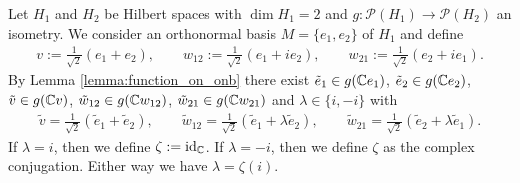 \begin{example} \label{example:twodim}
	Let $H_1$ and $H_2$ be Hilbert spaces with $\dim H_1 = 2$ and $g: \mathcal{P}(H_1) \to \mathcal{P}(H_2)$ an isometry. We consider an orthonormal basis $M = \{e_1, e_2\}$ of $H_1$ and define
	\begin{align*}
		v := \frac{1}{\sqrt{2}}(e_1 + e_2), \qquad w_{12} := \frac{1}{\sqrt{2}}(e_1 + i e_2), \qquad  w_{21} := \frac{1}{\sqrt{2}}(e_2 + i e_1).
	\end{align*} 
	By Lemma \ref{lemma:function_on_onb} there exist $\tilde{e}_1 \in g(\mathbb{C} e_1)$, $\tilde{e}_2 \in g(\mathbb{C} e_2)$, $\tilde{v} \in g(\mathbb{C} v)$, $\tilde{w}_{12} \in g(\mathbb{C} w_{12})$, $\tilde{w}_{21} \in g(\mathbb{C} w_{21})$ and $\lambda \in \{i, -i\}$ with
	\begin{align*}
		\tilde{v} = \frac{1}{\sqrt{2}}(\tilde{e}_1 + \tilde{e}_2), \qquad \tilde{w}_{12} = \frac{1}{\sqrt{2}}(\tilde{e}_1 + \lambda \tilde{e}_2), \qquad \tilde{w}_{21} = \frac{1}{\sqrt{2}}(\tilde{e}_2 + \lambda \tilde{e}_1).
	\end{align*} 
	If $\lambda = i$, then we define $\zeta := \operatorname{id}_{\mathbb{C}}$. If $\lambda = -i$, then we define $\zeta$ as the complex conjugation. Either way we have $\lambda = \zeta(i)$.
	

\end{example}
